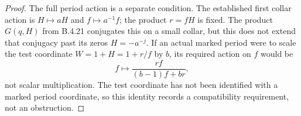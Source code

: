 \begin{proof}
The full period action is a separate condition. The established
first collar action is $H\mapsto aH$ and $f\mapsto a^{-1}f$;
the product $r=fH$ is fixed. The product $G(q,H)$ from B.4.21
conjugates this on a small collar, but this does not extend that
conjugacy past its zeros $H=-a^{-j}$. If an actual marked period
were to scale the test coordinate $W=1+H=1+r/f$ by $b$, its
required action on $f$ would be
\[
 f\longmapsto\frac{rf}{(b-1)f+br},
\]
not scalar multiplication. The test coordinate has not been
identified with a marked period coordinate, so this identity
records a compatibility requirement, not an obstruction.
\end{proof}
